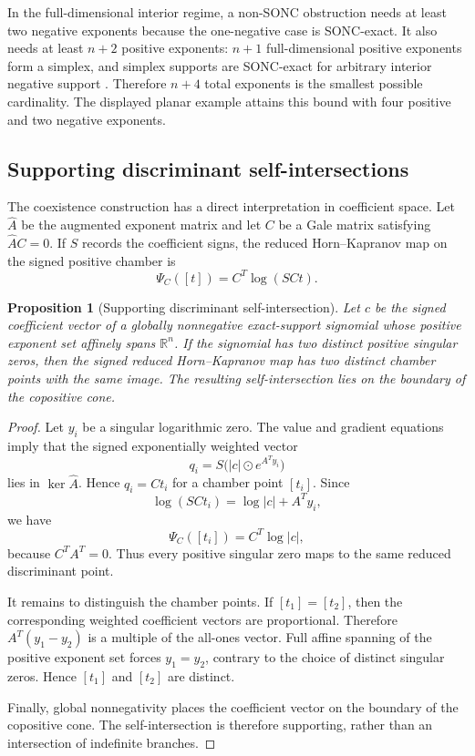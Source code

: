 \documentclass[11pt]{article}
\theoremstyle{plain}
\newtheorem{proposition}[theorem]{Proposition}
\theoremstyle{definition}
\theoremstyle{remark}
\newcommand{\R}{\mathbb R}
\begin{document}
In the full-dimensional interior regime, a non-SONC obstruction needs at least two negative exponents because the one-negative case is SONC-exact. It also needs at least $n+2$ positive exponents: $n+1$ full-dimensional positive exponents form a simplex, and simplex supports are SONC-exact for arbitrary interior negative support \cite[Theorem~1.2]{AETdW}. Therefore $n+4$ total exponents is the smallest possible cardinality. The displayed planar example attains this bound with four positive and two negative exponents.

\subsection{Supporting discriminant self-intersections}

The coexistence construction has a direct interpretation in coefficient space. Let $\widehat A$ be the augmented exponent matrix and let $C$ be a Gale matrix satisfying $\widehat AC=0$. If $S$ records the coefficient signs, the reduced Horn--Kapranov map on the signed positive chamber is
\[
 \Psi_C([t])=C^T\log(SCt).
\]

\begin{proposition}[Supporting discriminant self-intersection]\label{prop:supporting-discriminant}
Let $c$ be the signed coefficient vector of a globally nonnegative exact-support signomial whose positive exponent set affinely spans $\R^n$. If the signomial has two distinct positive singular zeros, then the signed reduced Horn--Kapranov map has two distinct chamber points with the same image. The resulting self-intersection lies on the boundary of the copositive cone.
\end{proposition}

\begin{proof}
Let $y_i$ be a singular logarithmic zero. The value and gradient equations imply that the signed exponentially weighted vector
\[
 q_i=S\bigl(|c|\odot e^{A^Ty_i}\bigr)
\]
lies in $\ker\widehat A$. Hence $q_i=Ct_i$ for a chamber point $[t_i]$. Since
\[
 \log(SCt_i)=\log|c|+A^Ty_i,
\]
we have
\[
 \Psi_C([t_i])=C^T\log|c|,
\]
because $C^TA^T=0$. Thus every positive singular zero maps to the same reduced discriminant point.

It remains to distinguish the chamber points. If $[t_1]=[t_2]$, then the corresponding weighted coefficient vectors are proportional. Therefore $A^T(y_1-y_2)$ is a multiple of the all-ones vector. Full affine spanning of the positive exponent set forces $y_1=y_2$, contrary to the choice of distinct singular zeros. Hence $[t_1]$ and $[t_2]$ are distinct.

Finally, global nonnegativity places the coefficient vector on the boundary of the copositive cone. The self-intersection is therefore supporting, rather than an intersection of indefinite branches.
\end{proof}
\end{document}
